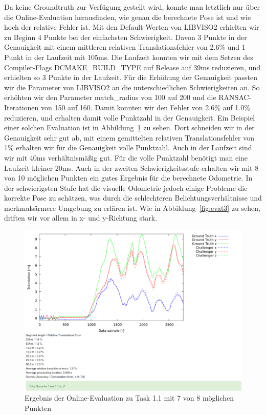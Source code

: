 \documentclass[12pt,titlepage, a4paper]{article}
\begin{document}
Da keine Groundtruth zur Verfügung gestellt wird, konnte man letztlich nur über die Online-Evaluation herausfinden, wie genau die berechnete Pose ist und wie hoch der relative Fehler ist.
Mit den Default-Werten von LIBVISO2 erhielten wir zu Beginn 4 Punkte bei der einfachsten Schwierigkeit. 
Davon 3 Punkte in der Genauigkeit mit einem mittleren relativen Translationsfehler von 2.6\% und 1 Punkt in der Laufzeit mit 105ms.
Die Laufzeit konnten wir mit dem Setzen des Compiler-Flags DCMAKE\_BUILD\_TYPE auf Release auf 39ms reduzieren, und erhielten so 3 Punkte in der Laufzeit.
Für die Erhöhung der Genauigkeit passten wir die Parameter von LIBVISO2 an die unterschiedlichen Schwierigkeiten an. 
So erhöhten wir den Parameter match\_radius von 100 auf 200 und die RANSAC-Iterationen von 150 auf 160.
Damit konnten wir den Fehler von 2.6\% auf 1.0\% reduzieren, und erhalten damit volle Punktzahl in der Genauigkeit.
Ein Beispiel einer solchen Evaluation ist in Abbildung~\ref{fig:evat1} zu sehen. Dort schneiden wir in der Genauigkeit sehr gut ab, mit einem gemittelten relativen Translationsfehler 
von 1\% erhalten wir für die Genauigkeit volle Punktzahl. Auch in der Laufzeit sind wir mit 40ms verhältnismäßig gut. Für die volle Punktzahl benötigt man eine Laufzeit kleiner 20ms.
Auch in der zweiten Schwierigkeitsstufe erhalten wir mit 8 von 10 möglichen Punkten ein gutes Ergebnis für die berechnete Odometrie. In der schwierigsten Stufe hat die visuelle Odometrie
jedoch einige Probleme die korrekte Pose zu schätzen, was durch die schlechteren Belichtungsverhältnisse und merkmalsärmere Umgebung zu erlären ist.
Wie in Abbildung~\ref{fig:evat3} zu sehen, driften wir vor allem in x- und y-Richtung stark.


\begin{figure}[h!]
 \centering
 \includegraphics[width=\textwidth]{./Screens/t1_opt2_april.png}
 \caption{Ergebnis der Online-Evaluation zu Task 1.1 mit 7 von 8 möglichen Punkten} \label{fig:evat1}
\end{figure}
\end{document}
